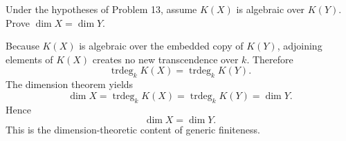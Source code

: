 \begin{problem}\label{prob:vi30-14}
Under the hypotheses of Problem 13, assume \(K(X)\) is algebraic over \(K(Y)\). Prove \(\dim X=\dim Y\).

\end{problem}

\ifdefined\FullProblemDossiers
\begin{solution}
Because \(K(X)\) is algebraic over the embedded copy of \(K(Y)\), adjoining elements of \(K(X)\) creates no
new transcendence over \(k\). Therefore
\[
\operatorname{trdeg}_kK(X)
=
\operatorname{trdeg}_kK(Y).
\]
The dimension theorem yields
\[
\dim X
=
\operatorname{trdeg}_kK(X)
=
\operatorname{trdeg}_kK(Y)
=
\dim Y.
\]
Hence
\[
\boxed{\dim X=\dim Y}.
\]
This is the dimension-theoretic content of generic finiteness.
\end{solution}
\fi
